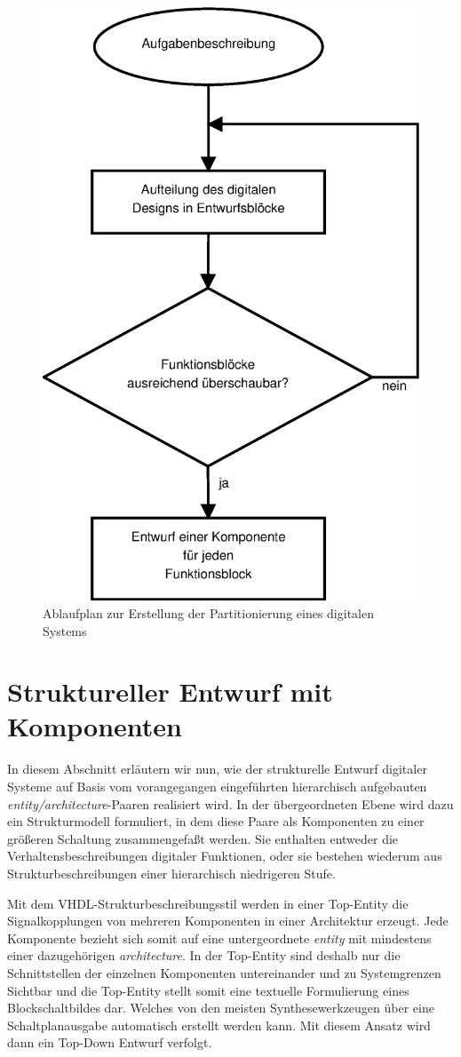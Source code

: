 \documentclass{article}
\begin{document}
\begin{figure}[here]
	\begin{center}
		\includegraphics[width=0.25 \textwidth]{includes/Partitionierung.eps}
		\caption[Ablaufplan Partitionierung]{Ablaufplan zur Erstellung der Partitionierung eines digitalen Systems}
		\label{fig:Partitionierung}
	\end{center}
\end{figure}

\section{Struktureller Entwurf mit Komponenten}
In diesem Abschnitt erläutern wir nun, wie der strukturelle Entwurf digitaler Systeme auf Basis vom
vorangegangen eingeführten hierarchisch aufgebauten \emph{entity/architecture}-Paaren realisiert wird.
In der übergeordneten Ebene wird dazu ein Strukturmodell formuliert, in dem diese Paare als 
Komponenten zu einer größeren Schaltung zusammengefaßt werden. Sie enthalten entweder die 
Verhaltensbeschreibungen digitaler Funktionen, oder sie bestehen wiederum aus Strukturbeschreibungen
einer hierarchisch niedrigeren Stufe. \cite{Reichardt}

Mit dem VHDL-Strukturbeschreibungsstil werden in einer Top-Entity die Signalkopplungen von mehreren
Komponenten in einer Architektur erzeugt. Jede Komponente bezieht sich somit auf eine untergeordnete
\emph{entity} mit mindestens einer dazugehörigen \emph{architecture}. In der Top-Entity sind deshalb 
nur die Schnittstellen der einzelnen Komponenten untereinander und zu Systemgrenzen Sichtbar und die
Top-Entity stellt somit eine textuelle Formulierung eines Blockschaltbildes dar. Welches von den
meisten Synthesewerkzeugen über eine Schaltplanausgabe automatisch erstellt werden kann.
\cite{Quartus-Manual} \cite{ISE-Manual} Mit diesem Ansatz wird dann ein Top-Down Entwurf verfolgt.
\end{document}
